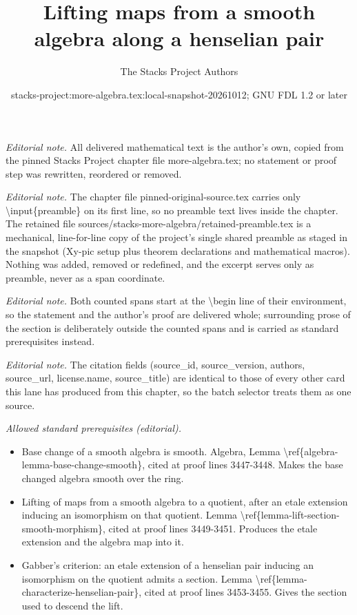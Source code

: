 \documentclass[10pt,a4paper]{amsart}
\title{Lifting maps from a smooth algebra along a henselian pair}
\author{The Stacks Project Authors}
\date{stacks-project:more-algebra.tex:local-snapshot-20261012; GNU FDL 1.2 or later}
\theoremstyle{plain}
\theoremstyle{definition}
\theoremstyle{remark}
\numberwithin{equation}{subsection}
\begin{document}
\maketitle
\setcounter{subsection}{1}
\noindent\textit{Editorial note.} All delivered mathematical text is the author's own, copied from the pinned Stacks Project chapter file more-algebra.tex; no statement or proof step was rewritten, reordered or removed.\par\medskip
\noindent\textit{Editorial note.} The chapter file pinned-original-source.tex carries only \textbackslash{}input\{preamble\} on its first line, so no preamble text lives inside the chapter. The retained file sources/stacks-more-algebra/retained-preamble.tex is a mechanical, line-for-line copy of the project's single shared preamble as staged in the snapshot (Xy-pic setup plus theorem declarations and mathematical macros). Nothing was added, removed or redefined, and the excerpt serves only as preamble, never as a span coordinate.\par\medskip
\noindent\textit{Editorial note.} Both counted spans start at the \textbackslash{}begin line of their environment, so the statement and the author's proof are delivered whole; surrounding prose of the section is deliberately outside the counted spans and is carried as standard prerequisites instead.\par\medskip
\noindent\textit{Editorial note.} The citation fields (source\_id, source\_version, authors, source\_url, license.name, source\_title) are identical to those of every other card this lane has produced from this chapter, so the batch selector treats them as one source.\par\medskip
\noindent\textit{Allowed standard prerequisites (editorial).}\begin{itemize}
\item Base change of a smooth algebra is smooth. Algebra, Lemma \textbackslash{}ref\{algebra-lemma-base-change-smooth\}, cited at proof lines 3447-3448. Makes the base changed algebra smooth over the ring.
\item Lifting of maps from a smooth algebra to a quotient, after an etale extension inducing an isomorphism on that quotient. Lemma \textbackslash{}ref\{lemma-lift-section-smooth-morphism\}, cited at proof lines 3449-3451. Produces the etale extension and the algebra map into it.
\item Gabber's criterion: an etale extension of a henselian pair inducing an isomorphism on the quotient admits a section. Lemma \textbackslash{}ref\{lemma-characterize-henselian-pair\}, cited at proof lines 3453-3455. Gives the section used to descend the lift.
\end{itemize}\medskip
\end{document}
